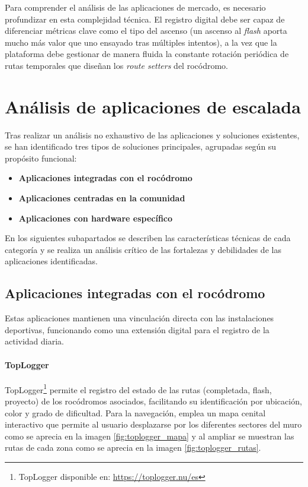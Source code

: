 Para comprender el análisis de las aplicaciones de mercado, es necesario profundizar en esta complejidad técnica. El registro digital debe ser capaz de diferenciar métricas clave como el tipo del ascenso (un ascenso al \textit{flash} aporta mucho más valor que uno ensayado tras múltiples intentos), a la vez que la plataforma debe gestionar de manera fluida la constante rotación periódica de rutas temporales que diseñan los \textit{route setters} del rocódromo.

\section{Análisis de aplicaciones de escalada}

Tras realizar un análisis no exhaustivo de las aplicaciones y soluciones existentes, se han identificado tres tipos de soluciones principales, agrupadas según su propósito funcional:
\begin{itemize}
\item \textbf{Aplicaciones integradas con el rocódromo}
\item \textbf{Aplicaciones centradas en la comunidad}
\item \textbf{Aplicaciones con hardware específico} 
\end{itemize}

En los siguientes subapartados se describen las características técnicas de cada categoría y se realiza un análisis crítico de las fortalezas y debilidades de las aplicaciones identificadas.

\subsection{Aplicaciones integradas con el rocódromo}

Estas aplicaciones mantienen una vinculación directa con las instalaciones deportivas, funcionando como una extensión digital para el registro de la actividad diaria.

\paragraph{TopLogger}
TopLogger\footnote{TopLogger disponible en: \url{https://toplogger.nu/es}} permite el registro del estado de las rutas (completada, flash, proyecto) de los rocódromos asociados, facilitando su identificación por ubicación, color y grado de dificultad. Para la navegación, emplea un mapa cenital interactivo que permite al usuario desplazarse por los diferentes sectores del muro como se aprecia en la imagen \ref{fig:toplogger_mapa} y al ampliar se muestran las rutas de cada zona como se aprecia en la imagen \ref{fig:toplogger_rutas}.

